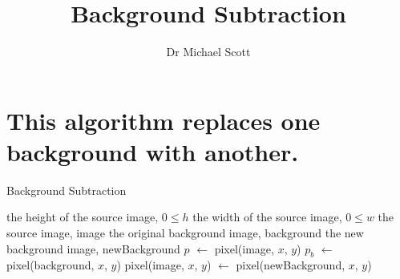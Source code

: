 \documentclass{../../../fal_assignment}
\title{Background Subtraction}
\author{Dr Michael Scott}
\begin{document}
\maketitle

	\section{This algorithm replaces one background with another.}
\begin{algorithm}[ht]
	\caption{Background Subtraction}
	\label{alg:algorithm}
	
	\begin{algorithmic}[1]
		\Require
		\Statex the height of the source image, $0 \leq h$
		\Statex the width of the source image, $0 \leq w$
		\Statex the source image, image
		\Statex the original background image, background
		\Statex the new background image, newBackground
			\State $p$ $\leftarrow$ pixel(image, $x$, $y$)
			\State $p_{b}$ $\leftarrow$ pixel(background, $x$, $y$)
				\State pixel(image, $x$, $y$) $\leftarrow$ pixel(newBackground, $x$, $y$)
			\EndIf
		\EndFor
		\EndFor
		\EndProcedure
	\end{algorithmic}
	
\end{algorithm}
\end{document}
